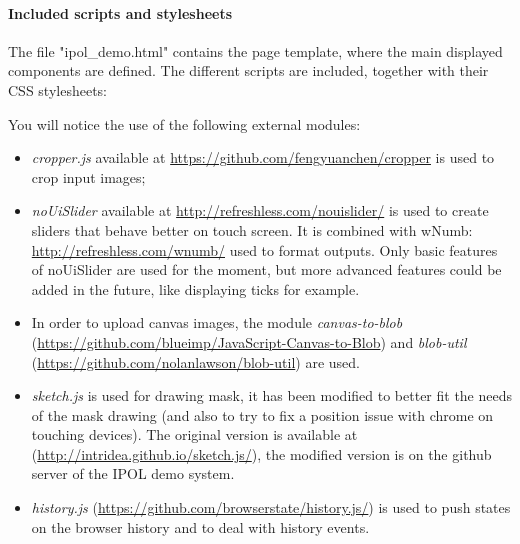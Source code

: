 \paragraph{Included scripts and stylesheets}
The file "ipol\_demo.html" contains the page template, where the main displayed components are defined.
The different scripts are included, together with their CSS stylesheets:

%

You will notice the use of the following external modules:
\begin{itemize}
 \item \emph{cropper.js} available at 
        \url{https://github.com/fengyuanchen/cropper} is used to crop input 
        images; 
 \item \emph{noUiSlider} available at 
        \url{http://refreshless.com/nouislider/} is used to create sliders that
        behave better on touch screen. It is combined with wNumb: 
        \url{http://refreshless.com/wnumb/} used to format outputs.
        Only basic features of noUiSlider are used for the moment, but more 
        advanced features could be added in the future, like displaying ticks 
        for example.
  \item In order to upload canvas images, the module 
        \emph{canvas-to-blob} 
        (\url{https://github.com/blueimp/JavaScript-Canvas-to-Blob}) and 
        \emph{blob-util} (\url{https://github.com/nolanlawson/blob-util}) are 
        used.
  \item \emph{sketch.js} is used for drawing mask, it has been 
        modified to better fit the needs of the mask drawing (and also to try 
        to fix a position issue with chrome on touching devices). The original   
        version is available at (\url{http://intridea.github.io/sketch.js/}), 
        the modified version is on the github server of the IPOL demo system.
  \item \emph{history.js} (\url{https://github.com/browserstate/history.js/}) is 
        used to push states on the browser history and to deal with  
        history events.
\end{itemize}


